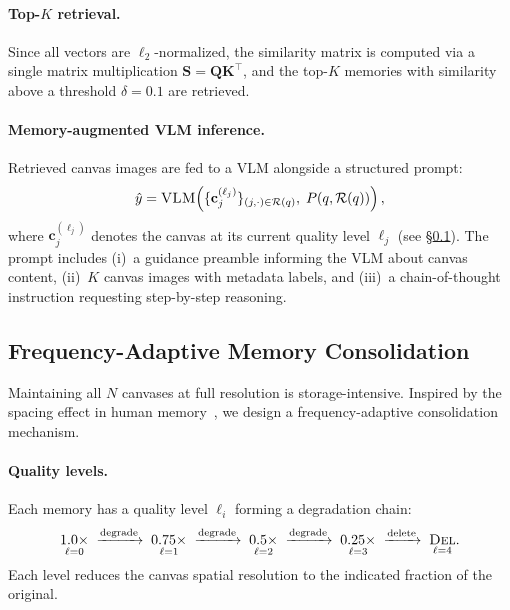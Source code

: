 \documentclass{article}
\begin{document}
\paragraph{Top-$K$ retrieval.}
Since all vectors are $\ell_2$-normalized, the similarity matrix is computed via a single matrix multiplication $\mathbf{S} = \mathbf{Q}\mathbf{K}^\top$, and the top-$K$ memories with similarity above a threshold $\delta = 0.1$ are retrieved.

\paragraph{Memory-augmented VLM inference.}
Retrieved canvas images are fed to a VLM alongside a structured prompt:
\begin{equation}
  \hat{y} = \textsc{VLM}\!\left(\{\mathbf{c}_{j}^{(\ell_j)}\}_{(j,\cdot)\in\mathcal{R}(q)},\; P(q, \mathcal{R}(q))\right),
\end{equation}
where $\mathbf{c}_{j}^{(\ell_j)}$ denotes the canvas at its current quality level $\ell_j$ (see \S\ref{sec:consolidation}). The prompt includes (i)~a guidance preamble informing the VLM about canvas content, (ii)~$K$ canvas images with metadata labels, and (iii)~a chain-of-thought instruction requesting step-by-step reasoning.

\subsection{Frequency-Adaptive Memory Consolidation}
\label{sec:consolidation}

Maintaining all $N$ canvases at full resolution is storage-intensive. Inspired by the spacing effect in human memory~\citep{ebbinghaus1885memory}, we design a frequency-adaptive consolidation mechanism.

\paragraph{Quality levels.}
Each memory has a quality level $\ell_i$ forming a degradation chain:
\begin{equation}
  \underset{\ell=0}{1.0\times} \;\xrightarrow{\text{degrade}}\; \underset{\ell=1}{0.75\times} \;\xrightarrow{\text{degrade}}\; \underset{\ell=2}{0.5\times} \;\xrightarrow{\text{degrade}}\; \underset{\ell=3}{0.25\times} \;\xrightarrow{\text{delete}}\; \underset{\ell=4}{\textsc{Del}}.
  \label{eq:quality_chain}
\end{equation}
Each level reduces the canvas spatial resolution to the indicated fraction of the original.
\end{document}
